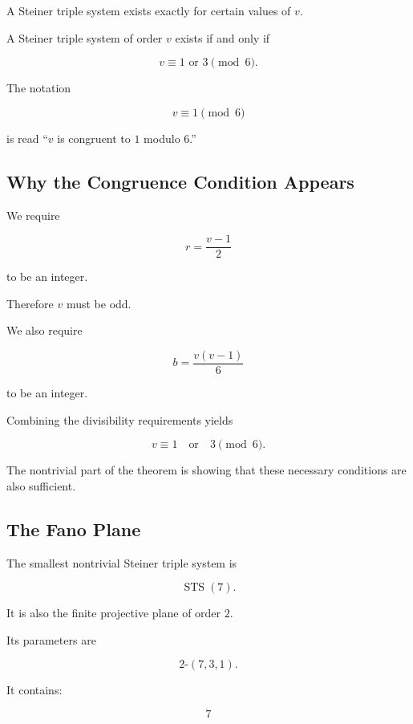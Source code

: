 A Steiner triple system exists exactly for certain values of \(v\).

\begin{theorem}
A Steiner triple system of order \(v\) exists if and only if

\[
\boxed{
v\equiv1\text{ or }3\pmod6.
}
\]
\end{theorem}

The notation

\[
v\equiv1\pmod6
\]

is read ``\(v\) is congruent to \(1\) modulo \(6\).''

\subsection{Why the Congruence Condition Appears}
\label{subsec:sts-congruence}

We require

\[
r=\frac{v-1}{2}
\]

to be an integer.

Therefore \(v\) must be odd.

We also require

\[
b=\frac{v(v-1)}{6}
\]

to be an integer.

Combining the divisibility requirements yields

\[
\boxed{
v\equiv1
\quad\text{or}\quad
3
\pmod6.
}
\]

The nontrivial part of the theorem is showing that these necessary
conditions are also sufficient.

\subsection{The Fano Plane}
\label{subsec:fano-plane-design}

The smallest nontrivial Steiner triple system is

\[
\operatorname{STS}(7).
\]

It is also the finite projective plane of order \(2\).

Its parameters are

\[
\boxed{
2\text{-}(7,3,1).
}
\]

It contains:

\[
7
\]

